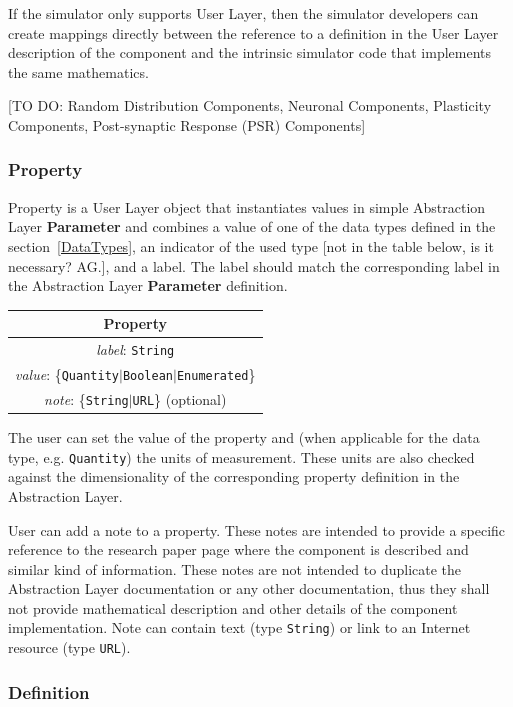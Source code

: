 \documentclass{article}
\newcommand{\Parameter}{{\bf{Parameter}}\xspace}
\begin{document}
If the simulator only supports User Layer, then the simulator developers
can create mappings directly between the reference to a definition in the
User Layer description of the component and the intrinsic simulator code
that implements the same mathematics.

[TO DO: Random Distribution Components, Neuronal Components, Plasticity Components, Post-synaptic Response (PSR) Components]

\subsubsection{Property}

Property is a User Layer object that instantiates values in simple
Abstraction Layer \Parameter and combines a value of one of the data
types defined in the section~\ref{DataTypes}, an indicator of the used type
[not in the table below, is it necessary? AG.],
and a label. The label should match the corresponding label in the
Abstraction Layer \Parameter definition.

\begin{table}[htb]
\center
\begin{tabular}{|c|}
\hline
\hline
Property \\
\hline
\hline
{\em label}: {\tt String} \\
\hline
{\em value}: \{{\tt Quantity}$|${\tt Boolean}$|${\tt Enumerated}\} \\
\hline
{\em note}: \{{\tt String}$|${\tt URL}\} (optional)\\
\hline
\end{tabular}
\end{table}

The user can set the value of the property and (when applicable for the data
type, e.g. {\tt Quantity}) the units of measurement. These units are also
checked against the dimensionality of the corresponding property definition
in the Abstraction Layer.

User can add a note to a property. These notes are
intended to provide a specific reference to the research paper page
where the component is described and similar kind of information. These
notes are not intended to duplicate the Abstraction Layer documentation
or any other documentation, thus they shall not provide mathematical
description and other details of the component implementation. Note can
contain text (type {\tt String}) or link to an Internet resource (type
{\tt URL}).

\subsubsection{Definition}
\end{document}
